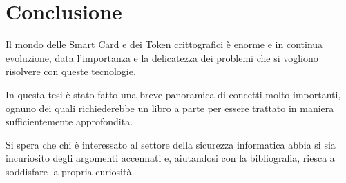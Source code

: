 \chapter*{Conclusione}
\label{epilogue}
Il mondo delle Smart Card e dei Token crittografici è enorme e in continua evoluzione, data l'importanza e la delicatezza dei problemi che si vogliono risolvere con queste tecnologie.

In questa tesi è stato fatto una breve panoramica di concetti molto importanti, ognuno dei quali richiederebbe un libro a parte per essere trattato in maniera sufficientemente approfondita.

Si spera che chi è interessato al settore della sicurezza informatica abbia si sia incuriosito degli argomenti accennati e, aiutandosi con la bibliografia, riesca a soddisfare la propria curiosità.